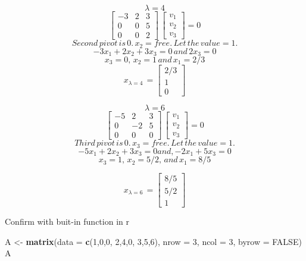 \documentclass[]{article}
\newenvironment{Shaded}{\begin{snugshade}}{\end{snugshade}}
\newcommand{\DataTypeTok}[1]{\textcolor[rgb]{0.13,0.29,0.53}{#1}}
\newcommand{\DecValTok}[1]{\textcolor[rgb]{0.00,0.00,0.81}{#1}}
\newcommand{\KeywordTok}[1]{\textcolor[rgb]{0.13,0.29,0.53}{\textbf{#1}}}
\newcommand{\NormalTok}[1]{#1}
\newcommand{\OtherTok}[1]{\textcolor[rgb]{0.56,0.35,0.01}{#1}}
\newcommand{\StringTok}[1]{\textcolor[rgb]{0.31,0.60,0.02}{#1}}
\begin{document}
\[\lambda=4\]
\[ \begin{bmatrix}-3 & 2 & 3 \\0 & 0 & 5\\0 & 0 & 2\end{bmatrix}\,\begin{bmatrix}v_1 \\v_2 \\v_3\end{bmatrix}=0\]
\[Second\,pivot\,is\, 0.\,x_2=free.\,Let\,the\,value=1.\]
\[-3x_1+2x_2 +3x_3 = 0\,and\, 2x_3 = 0\] \[x_3=0,\,x_2=1\,and\,x_1=2/3\]
\[x_{\lambda=4}\,=\begin{bmatrix}2/3\\1 \\0\end{bmatrix}\]

\[\lambda=6\]
\[ \begin{bmatrix}-5 & 2 & 3\\0 & -2 & 5\\0 & 0 & 0\end{bmatrix}\,\begin{bmatrix}v_1 \\v_2 \\v_3\end{bmatrix}=0\]
\[Third\,pivot\,is\, 0.\,x_3=free.\,Let\,the\,value=1.\]
\[-5x_1 +2x_2 +3x_3 = 0 and, -2x_1+5x_3 = 0\]
\[x_3 = 1,\,x_2 = 5/2,\,and\,x_1=8/5\]

\[x_{\lambda=6}\,=\begin{bmatrix}8/5 \\5/2 \\1\end{bmatrix}\]

Confirm with buit-in function in r

\begin{Shaded}
\begin{Highlighting}[]
\NormalTok{A <-}\StringTok{ }\KeywordTok{matrix}\NormalTok{(}\DataTypeTok{data =} \KeywordTok{c}\NormalTok{(}\DecValTok{1}\NormalTok{,}\DecValTok{0}\NormalTok{,}\DecValTok{0}\NormalTok{,}
                     \DecValTok{2}\NormalTok{,}\DecValTok{4}\NormalTok{,}\DecValTok{0}\NormalTok{,}
                     \DecValTok{3}\NormalTok{,}\DecValTok{5}\NormalTok{,}\DecValTok{6}\NormalTok{), }\DataTypeTok{nrow =} \DecValTok{3}\NormalTok{, }\DataTypeTok{ncol =} \DecValTok{3}\NormalTok{, }\DataTypeTok{byrow =} \OtherTok{FALSE}\NormalTok{)}
\NormalTok{A}
\end{Highlighting}
\end{Shaded}
\end{document}
